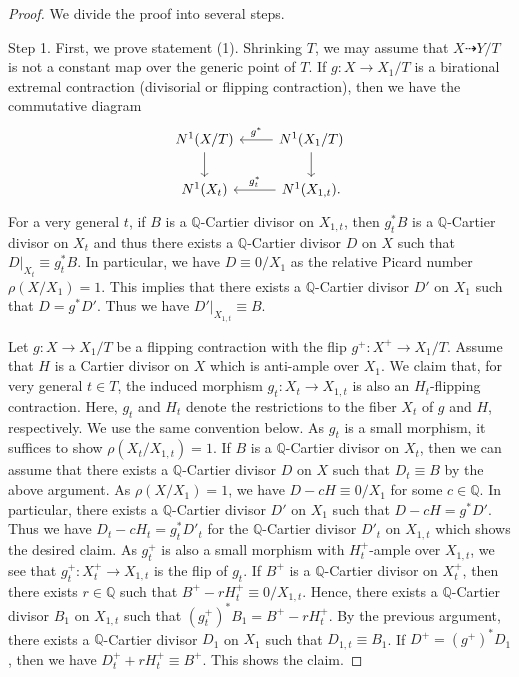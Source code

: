 \documentclass[11pt,oneside,reqno]{amsart}
\numberwithin{equation}{section}
\theoremstyle{definition}
\newcommand{\dto}{\dashrightarrow}
\newcommand{\bQ}{\mathbb{Q}}
\begin{document}
\begin{proof}
We divide the proof into several steps. 

Step 1. First, we prove statement (1). Shrinking $T$, we may assume that $X \dto Y/T$ is not a constant map over the generic point of $T$. If $g: X \to X_1/T$ is a birational extremal contraction (divisorial or flipping contraction), then we have the commutative diagram  \[
	\begin{tikzcd}
	 N^1(X/T) \arrow[d]&N^1(X_1/T)\arrow[d]\arrow[l, "g^*",swap] \\
	 N^1(X_t) &N^1(X_{1,t})\arrow[l, "g_t^*",swap].
	\end{tikzcd}
\] For a very general $t$, if $B$ is a $\bQ$-Cartier divisor on $X_{1,t}$, then $g_t^*B$ is a $\bQ$-Cartier divisor on $X_t$ and thus there exists a $\bQ$-Cartier divisor $D$ on $X$ such that $D|_{X_t} \equiv g_t^*B$. In particular, we have $D \equiv 0/X_1$ as the relative Picard number $\rho(X/X_1)=1$. This implies that there exists a $\bQ$-Cartier divisor $D'$ on $X_1$ such that $D=g^*D'$. Thus we have $D'|_{X_{1,t}} \equiv B$.

Let $g\colon X \to X_1/T$ be a flipping contraction with the flip $g^+\colon X^+ \to X_1/T$. Assume that $H$ is a Cartier divisor on $X$ which is anti-ample over $X_1$. We claim that, for very general $t\in T$, the induced morphism $g_t\colon X_t \to X_{1,t}$ is also an $H_t$-flipping contraction. Here, $g_t$ and $H_t$ denote the restrictions to the fiber $X_t$ of $g$ and $H$, respectively. We use the same convention below. As $g_t$ is a small morphism, it suffices to show $\rho(X_t/X_{1,t})=1$. If $B$ is a $\bQ$-Cartier divisor on $X_t$, then we can assume that there exists a $\bQ$-Cartier divisor $D$ on $X$ such that $D_t \equiv B$ by the above argument. As $\rho(X/X_1)=1$, we have $D-cH \equiv 0/X_1$ for some $c\in \bQ$. In particular, there exists a $\bQ$-Cartier divisor $D'$ on $X_1$ such that $D-cH =g^*D'$. Thus we have $D_t-cH_t =g_t^*D'_t$ for the $\bQ$-Cartier divisor $D'_t$ on $X_{1,t}$ which shows the desired claim. As $g_t^+$ is also a small morphism with $H_t^+$-ample over $X_{1,t}$, we see that $g_t^+: X^+_t \to X_{1,t}$ is the flip of $g_t$. If $B^+$ is a $\bQ$-Cartier divisor on $X_t^+$, then there exists $r \in \bQ$ such that $B^+ -rH^+_t \equiv 0/X_{1,t}$. Hence, there exists a $\bQ$-Cartier divisor $B_1$ on $X_{1,t}$ such that $(g_t^{+})^*B_1=B^+ -rH^+_t$. By the previous argument, there exists a $\bQ$-Cartier divisor $D_1$ on $X_1$ such that $D_{1,t} \equiv B_1$. If $D^+=(g^+)^*D_1$, then we have $D^+_t+rH^+_t\equiv B^+$. This shows the claim.



\end{proof}
\end{document}
